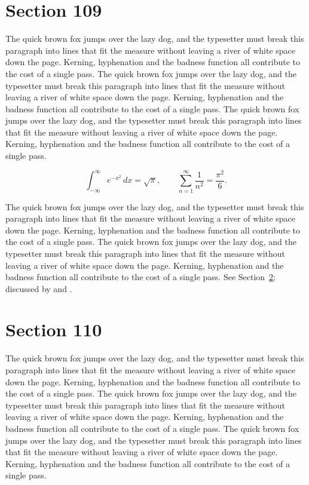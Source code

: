 \documentclass{article}
\begin{document}
\section{Section 109}
\label{sec:109}
The quick brown fox jumps over the lazy dog, and the typesetter must break this paragraph into lines that fit the measure without leaving a river of white space down the page. Kerning, hyphenation and the badness function all contribute to the cost of a single pass. The quick brown fox jumps over the lazy dog, and the typesetter must break this paragraph into lines that fit the measure without leaving a river of white space down the page. Kerning, hyphenation and the badness function all contribute to the cost of a single pass. The quick brown fox jumps over the lazy dog, and the typesetter must break this paragraph into lines that fit the measure without leaving a river of white space down the page. Kerning, hyphenation and the badness function all contribute to the cost of a single pass. 

\begin{equation}\label{eq:109}
\int_{-\infty}^{\infty} e^{-x^{2}}\,dx = \sqrt{\pi}, \qquad
\sum_{n=1}^{\infty} \frac{1}{n^{2}} = \frac{\pi^{2}}{6}.
\end{equation}

The quick brown fox jumps over the lazy dog, and the typesetter must break this paragraph into lines that fit the measure without leaving a river of white space down the page. Kerning, hyphenation and the badness function all contribute to the cost of a single pass. The quick brown fox jumps over the lazy dog, and the typesetter must break this paragraph into lines that fit the measure without leaving a river of white space down the page. Kerning, hyphenation and the badness function all contribute to the cost of a single pass. 
See Section~\ref{sec:110}; discussed by \textcite{k5} and \textcite{l2}.
\section{Section 110}
\label{sec:110}
The quick brown fox jumps over the lazy dog, and the typesetter must break this paragraph into lines that fit the measure without leaving a river of white space down the page. Kerning, hyphenation and the badness function all contribute to the cost of a single pass. The quick brown fox jumps over the lazy dog, and the typesetter must break this paragraph into lines that fit the measure without leaving a river of white space down the page. Kerning, hyphenation and the badness function all contribute to the cost of a single pass. The quick brown fox jumps over the lazy dog, and the typesetter must break this paragraph into lines that fit the measure without leaving a river of white space down the page. Kerning, hyphenation and the badness function all contribute to the cost of a single pass. 
\end{document}
